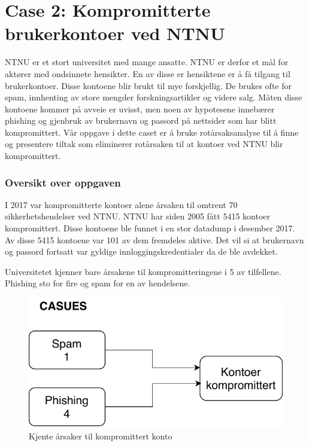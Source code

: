 \section{Case 2: Kompromitterte brukerkontoer ved NTNU}
\label{sec:case_kontoer}
NTNU er et stort universitet med mange ansatte. NTNU er derfor et mål for aktører med ondsinnete hensikter. En av disse er hensiktene er å få tilgang til brukerkontoer. Disse kontoene blir brukt til mye forskjellig. De brukes ofte for spam, innhenting av store mengder forskningsartikler og videre salg. Måten disse kontoene kommer på avveie er uvisst, men noen av hypotesene innebærer phishing og gjenbruk av brukernavn og passord på nettsider som har blitt kompromittert. Vår oppgave i dette caset er å bruke rotårsaksanalyse til å finne og presentere tiltak som eliminerer rotårsaken til at kontoer ved NTNU blir kompromittert.

\subsubsection{Oversikt over oppgaven}
I 2017 var kompromitterte kontoer alene årsaken til omtrent 70 sikkerhetshendelser ved NTNU. NTNU har siden 2005 fått 5415 kontoer kompromittert. Disse kontoene ble funnet i en stor datadump i desember 2017. Av disse 5415 kontoene var 101 av dem fremdeles aktive. Det vil si at brukernavn og passord fortsatt var gyldige innloggingskredentialer da de ble avdekket. 

Universitetet kjenner bare årsakene til kompromitteringene i 5 av tilfellene. Phishing sto for fire og spam for en av hendelsene. 

\begin{figure}[H]
    \centering
    \includegraphics[scale=0.6]{case_2/bilder/kjente_arsaker.pdf}
    \caption[Kjente årsaker til kompromittert konto]{Kjente årsaker til kompromittert konto}
    \label{fig:kjente-arsaker-kompromittert-konto}
\end{figure}

